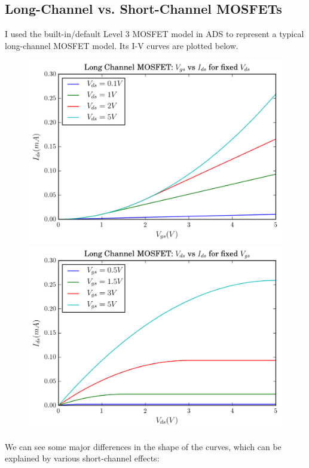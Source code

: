 \documentclass[11pt]{article}
\begin{document}
\subsection{Long-Channel vs. Short-Channel MOSFETs}
I used the built-in/default Level 3 MOSFET model in ADS to represent a typical long-channel MOSFET model. Its I-V curves are plotted below.
\begin{figure}[H]
	\includegraphics[width=\linewidth]{images/long_channel_vgs_vs_ids.png}
	\endminipage\hfill
	\includegraphics[width=\linewidth]{images/long_channel_vds_vs_ids.png}
	\endminipage
\end{figure}

We can see some major differences in the shape of the curves, which can be explained by various short-channel effects:
\end{document}
